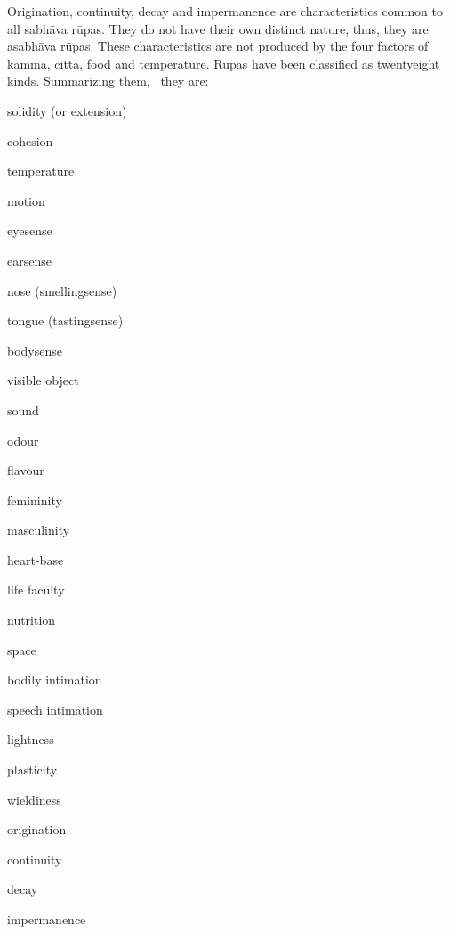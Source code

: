 \documentclass{book}
\begin{document}
Origination, continuity, decay and impermanence are characteristics
common to all sabh\=ava r\=upas. They do not have their own distinct nature,
thus, they are asabh{\=a}va r\=upas. These characteristics are not
produced by the four factors of kamma, citta, food and temperature. 
R\=upas have been classified as twentyeight kinds. Summarizing them,
\ they are:




\begin{description}
\item solidity (or extension)

\item cohesion

\item temperature

\item motion

\item eyesense

\item earsense

\item nose (smellingsense)

\item tongue (tastingsense)

\item bodysense

\item visible object

\item sound

\item odour

\item flavour

\item femininity

\item masculinity

\item heart-base

\item life faculty

\item nutrition

\item space

\item bodily intimation

\item speech intimation

\item lightness

\item plasticity

\item wieldiness

\item origination

\item continuity

\item decay

\item impermanence

\end{description}
\end{document}
